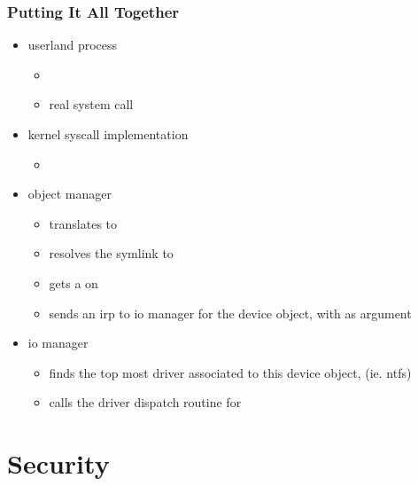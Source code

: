 \begin{frame}
  \frametitle{Putting It All Together}

  \begin{itemize}
    \item
      userland process
      \begin{itemize}
        \item
        \item
          real system call 
      \end{itemize}

    \item
      kernel syscall implementation
      \begin{itemize}
        \item
      \end{itemize}

    \item
      object manager
      \begin{itemize}
        \item
          translates  to 
        \item
          resolves the symlink to 
        \item
          gets a  on 
        \item
          sends an  irp to io manager for the device object,  with  as argument
      \end{itemize}

    \item
      io manager
      \begin{itemize}
        \item
          finds the top most driver associated to this device object, (ie. ntfs)
        \item
          calls the driver dispatch routine for 
      \end{itemize}

  \end{itemize}

\end{frame}

%
%

\section{Security}


